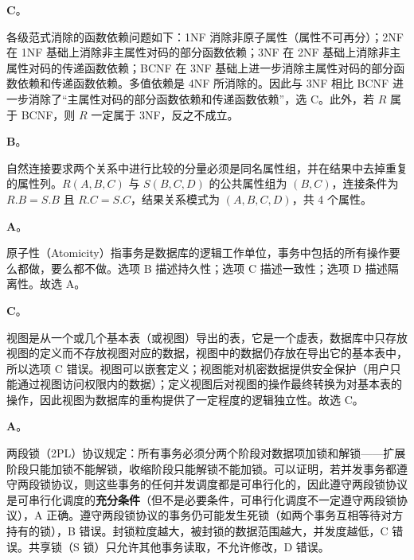 \documentclass[a4paper,11pt]{article}
\begin{document}
\q \textbf{C}。
\begin{analysis}
各级范式消除的函数依赖问题如下：1NF 消除非原子属性（属性不可再分）；2NF 在 1NF 基础上消除非主属性对码的部分函数依赖；3NF 在 2NF 基础上消除非主属性对码的传递函数依赖；BCNF 在 3NF 基础上进一步消除主属性对码的部分函数依赖和传递函数依赖。多值依赖是 4NF 所消除的。因此与 3NF 相比 BCNF 进一步消除了“主属性对码的部分函数依赖和传递函数依赖”，选 C。此外，若 $R$ 属于 BCNF，则 $R$ 一定属于 3NF，反之不成立。
\end{analysis}

\q \textbf{B}。
\begin{analysis}
自然连接要求两个关系中进行比较的分量必须是同名属性组，并在结果中去掉重复的属性列。$R(A,B,C)$ 与 $S(B,C,D)$ 的公共属性组为 $(B,C)$，连接条件为 $R.B=S.B$ 且 $R.C=S.C$，结果关系模式为 $(A,B,C,D)$，共 4 个属性。
\end{analysis}

\q \textbf{A}。
\begin{analysis}
原子性（Atomicity）指事务是数据库的逻辑工作单位，事务中包括的所有操作要么都做，要么都不做。选项 B 描述持久性；选项 C 描述一致性；选项 D 描述隔离性。故选 A。
\end{analysis}

\q \textbf{C}。
\begin{analysis}
视图是从一个或几个基本表（或视图）导出的表，它是一个虚表，数据库中只存放视图的定义而不存放视图对应的数据，视图中的数据仍存放在导出它的基本表中，所以选项 C 错误。视图可以嵌套定义；视图能对机密数据提供安全保护（用户只能通过视图访问权限内的数据）；定义视图后对视图的操作最终转换为对基本表的操作，因此视图为数据库的重构提供了一定程度的逻辑独立性。故选 C。
\end{analysis}

\q \textbf{A}。
\begin{analysis}
两段锁（2PL）协议规定：所有事务必须分两个阶段对数据项加锁和解锁——扩展阶段只能加锁不能解锁，收缩阶段只能解锁不能加锁。可以证明，若并发事务都遵守两段锁协议，则这些事务的任何并发调度都是可串行化的，因此遵守两段锁协议是可串行化调度的\textbf{充分条件}（但不是必要条件，可串行化调度不一定遵守两段锁协议），A 正确。遵守两段锁协议的事务仍可能发生死锁（如两个事务互相等待对方持有的锁），B 错误。封锁粒度越大，被封锁的数据范围越大，并发度越低，C 错误。共享锁（S 锁）只允许其他事务读取，不允许修改，D 错误。
\end{analysis}

\end{document}
